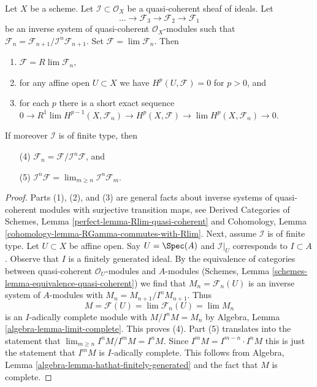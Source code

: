 \begin{lemma}
\label{lemma-properties-system}
Let $X$ be a scheme. Let $\mathcal{I} \subset \mathcal{O}_X$
be a quasi-coherent sheaf of ideals. Let
$$
\ldots \to \mathcal{F}_3 \to \mathcal{F}_2 \to \mathcal{F}_1
$$
be an inverse system of quasi-coherent $\mathcal{O}_X$-modules
such that
$\mathcal{F}_n = \mathcal{F}_{n + 1}/\mathcal{I}^n\mathcal{F}_{n + 1}$.
Set $\mathcal{F} = \lim \mathcal{F}_n$. Then
\begin{enumerate}
\item $\mathcal{F} = R\lim \mathcal{F}_n$,
\item for any affine open $U \subset X$ we have
$H^p(U, \mathcal{F}) = 0$ for $p > 0$, and
\item for each $p$ there is a short exact sequence
$0 \to R^1\lim H^{p - 1}(X, \mathcal{F}_n) \to
H^p(X, \mathcal{F}) \to \lim H^p(X, \mathcal{F}_n) \to 0$.
\end{enumerate}
If moreover $\mathcal{I}$ is of finite type, then
\begin{enumerate}
\item[(4)]
$\mathcal{F}_n = \mathcal{F}/\mathcal{I}^n\mathcal{F}$, and
\item[(5)]
$\mathcal{I}^n \mathcal{F} = \lim_{m \geq n} \mathcal{I}^n\mathcal{F}_m$.
\end{enumerate}
\end{lemma}

\begin{proof}
Parts (1), (2), and (3) are general facts about inverse systems of
quasi-coherent modules with surjective transition maps, see
Derived Categories of Schemes, Lemma \ref{perfect-lemma-Rlim-quasi-coherent}
and Cohomology, Lemma \ref{cohomology-lemma-RGamma-commutes-with-Rlim}.
Next, assume $\mathcal{I}$ is of finite type.
Let $U \subset X$ be affine open. Say $U = \Spec(A)$ and $\mathcal{I}|_U$
corresponds to $I \subset A$. Observe that $I$ is a finitely generated ideal.
By the equivalence of categories between quasi-coherent $\mathcal{O}_U$-modules
and $A$-modules (Schemes, Lemma \ref{schemes-lemma-equivalence-quasi-coherent})
we find that $M_n = \mathcal{F}_n(U)$ is an inverse system
of $A$-modules with $M_n = M_{n + 1}/I^nM_{n + 1}$. Thus
$$
M = \mathcal{F}(U) = \lim \mathcal{F}_n(U) = \lim M_n
$$
is an $I$-adically complete module with $M/I^nM = M_n$ by
Algebra, Lemma \ref{algebra-lemma-limit-complete}. This proves (4).
Part (5) translates into the statement that
$\lim_{m \geq n} I^nM/I^mM = I^nM$.
Since $I^mM = I^{m - n} \cdot I^nM$ this is just the statement that
$I^mM$ is $I$-adically complete. This follows from
Algebra, Lemma \ref{algebra-lemma-hathat-finitely-generated}
and the fact that $M$ is complete.
\end{proof}





